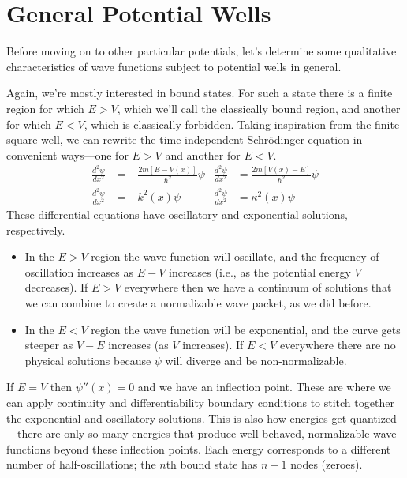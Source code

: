 \documentclass[../p052main.tex]{subfiles}
\begin{document}

\section{General Potential Wells}
Before moving on to other particular potentials, let's determine some qualitative characteristics of wave functions subject to potential wells in general.

Again, we're mostly interested in bound states.
For such a state there is a finite region for which $E > V$, which we'll call the classically bound region, and another for which $E < V$, which is classically forbidden.
Taking inspiration from the finite square well, we can rewrite the time-independent Schrödinger equation in convenient ways---one for $E > V$ and another for $E < V$.
\begin{align*}
    \frac{d^2 \psi}{d x^2} &= -\frac{2m[E - V(x)]}{\hbar^2} \psi & \frac{d^2 \psi}{d x^2} &= \frac{2m[V(x) - E]}{\hbar^2} \psi \\
    \frac{d^2 \psi}{d x^2} &= -k^2(x) \psi & \frac{d^2 \psi}{d x^2} &= \kappa^2(x) \psi
\end{align*}
These differential equations have oscillatory and exponential solutions, respectively.
\begin{itemize}[topsep=0pt]
    \item In the $E > V$ region the wave function will oscillate, and the frequency of oscillation increases as $E - V$ increases (i.e., as the potential energy $V$ decreases).
    If $E > V$ everywhere then we have a continuum of solutions that we can combine to create a normalizable wave packet, as we did before.

    \item In the $E < V$ region the wave function will be exponential, and the curve gets steeper as $V - E$ increases (as $V$ increases).
    If $E < V$ everywhere there are no physical solutions because $\psi$ will diverge and be non-normalizable.
\end{itemize}
If $E = V$ then $\psi''(x) = 0$ and we have an inflection point.
These are where we can apply continuity and differentiability boundary conditions to stitch together the exponential and oscillatory solutions.
This is also how energies get quantized---there are only so many energies that produce well-behaved, normalizable wave functions beyond these inflection points.
Each energy corresponds to a different number of half-oscillations; the $n$th bound state has $n-1$ nodes (zeroes).
\end{document}
